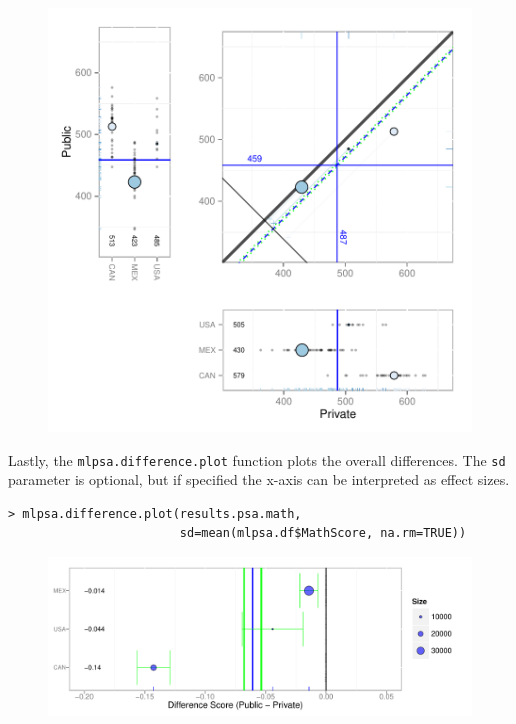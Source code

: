 \documentclass[letterpaper,12p,twoside]{article} %
\begin{document}
\begin{figure}[h!]
\begin{center}
\includegraphics[width=\textwidth]{../Figures/pisamlpsa.pdf}
\end{center}
\end{figure}

\clearpage
Lastly, the \texttt{mlpsa.difference.plot} function plots the overall differences. The \texttt{sd} parameter is optional, but if specified the x-axis can be interpreted as effect sizes.

\begin{verbatim}
> mlpsa.difference.plot(results.psa.math, 
                        sd=mean(mlpsa.df$MathScore, na.rm=TRUE))
\end{verbatim}

\begin{figure}[h!]
\begin{center}
\includegraphics[width=\textwidth]{../Figures/pisadiffplot.pdf}
\end{center}
\end{figure}
\end{document}
